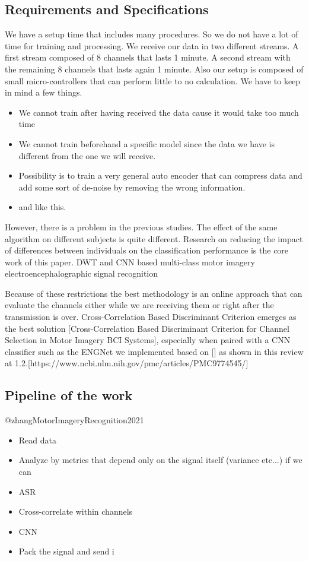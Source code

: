 \documentclass{Configuration_Files/PoliMi3i_thesis}
\begin{document}
\subsection{Requirements and Specifications}

We have a setup time that includes many procedures.
So we do not have a lot of time for training and processing.
We receive our data in two different streams.
A first stream composed of 8 channels that lasts 1 minute.
A second stream with the remaining 8 channels that lasts again 1 minute.
Also our setup is composed of small micro-controllers that can perform little to no calculation.
We have to keep in mind a few things.
\begin{itemize}
\item We cannot train after having received the data cause it would take too much time
\item We cannot train beforehand a specific model since the data we have is different from the one we will receive.
\item Possibility is to train a very general auto encoder that can compress data and add some sort of de-noise by removing the wrong information.
\item and like this.
\end{itemize}

However, there is a problem in the previous studies. The effect of the same algorithm on different subjects is quite different. Research on reducing the impact of differences between individuals on the classification performance is the core work of this paper.
{DWT and CNN based multi-class motor imagery electroencephalographic signal recognition}

Because of these restrictions the best methodology is an online approach that can evaluate the channels either while we are receiving them or right after the transmission is over.
Cross-Correlation Based Discriminant Criterion emerges as the best solution [Cross-Correlation Based Discriminant Criterion for
Channel Selection in Motor Imagery BCI Systems], especially when paired with a CNN classifier such as the ENGNet we implemented based on [] as shown in this review at 1.2.[https://www.ncbi.nlm.nih.gov/pmc/articles/PMC9774545/]


\subsection{Pipeline of the work}
@zhangMotorImageryRecognition2021

\begin{itemize}
\item Read data
\item Analyze by metrics that depend only on the signal itself (variance etc...) if we can
\item ASR 
\item Cross-correlate within channels
\item CNN
\item Pack the signal and send i
\end{itemize}
\end{document}
